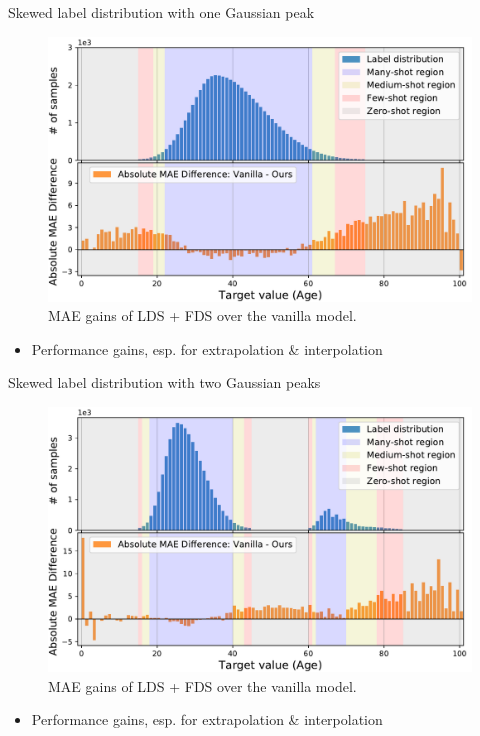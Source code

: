\begin{frame}{Skewed label distribution with one Gaussian peak}
	\begin{figure}[h]
		\includegraphics[width=0.7\linewidth]{images/interp_extrap_diff_peak1.pdf}
		\caption{MAE gains of LDS + FDS over the vanilla model.}
	\end{figure}
	\begin{itemize}
		\item Performance gains, esp. for extrapolation \& interpolation
	\end{itemize}
\end{frame}

\begin{frame}{Skewed label distribution with two Gaussian peaks}
	\begin{figure}[h]
		\includegraphics[width=0.7\linewidth]{images/interp_extrap_diff_peak2.pdf}
		\caption{MAE gains of LDS + FDS over the vanilla model.}
	\end{figure}
	\begin{itemize}
		\item Performance gains, esp. for extrapolation \& interpolation
	\end{itemize}
\end{frame}

